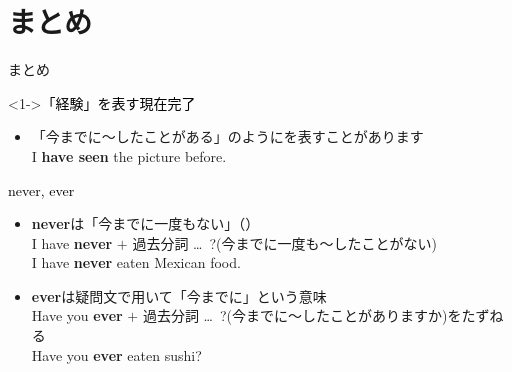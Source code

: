 \documentclass[aspectratio=169,xcolor={dvipsnames,table}]{beamer}
\begin{document}
\section{まとめ}
\begin{frame}[plain]{まとめ}
 
\begin{exampleblock}<1->{\textcolor{black}{\mdseries 「経験」を表す現在完了}}
\small

\begin{itemize}[square]
 \item 「今までに～したことがある」のようにを表すことがあります\\
\hfill{\scriptsize I {\bfseries have seen} the picture before.}
\end{itemize}
\end{exampleblock}

\begin{exampleblock}{\textcolor{black}{\mdseries never, ever}}
\small
\begin{itemize}[square]\small
 \item {\bfseries never}は「今までに一度もない」（）\\
I have {\bfseries never} $+$ 過去分詞 \ldots\,\,\,?{{\footnotesize (今までに一度も〜したことがない)}}\\

\hfill{\scriptsize I have {\bfseries never} eaten Mexican food.}
 \item {\bfseries ever}は疑問文で用いて「今までに」という意味\\
Have you  {\bfseries ever} $+$ 過去分詞 \ldots\,\,\,?{{\footnotesize (今までに〜したことがありますか)}}\hfill{をたずねる}\\
\hfill{\scriptsize Have you {\bfseries ever} eaten sushi?}
\end{itemize}
\end{exampleblock}
\end{frame}
\end{document}
